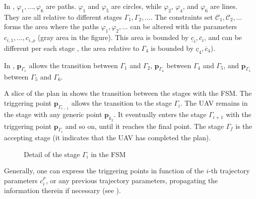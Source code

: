 In , $\varphi_1,\dots,\varphi_6$ are paths. $\varphi_1$ and $\varphi_5$ are circles, while $\varphi_2$, $\varphi_4$, and $\varphi_6$ are lines. They are all relative to different stages $\Gamma_1,\Gamma_2,\dots$. The constraints set $\mathcal{C}_1,\mathcal{C}_2,\dots$ forms the area where the paths $\varphi_1,\varphi_2,\dots$ can be altered with the parameters $c_{i,1},\dots,c_{i,\rho}$ (gray area in the figure). This area is bounded by $\underline{c}_i,\overline{c}_i$, and can be different per each stage , the area relative to $\Gamma_4$ is bounded by $\underline{c}_4,\overline{c}_4$).

In , $\mathbf{p}_{\Gamma_1}$ allows the transition between $\Gamma_1$ and $\Gamma_2$, $\mathbf{p}_{\Gamma_4}$ between $\Gamma_4$ and $\Gamma_5$, and $\mathbf{p}_{\Gamma_5}$ between $\Gamma_5$ and $\Gamma_6$.

A slice of the plan in  shows the transition between the stages with the FSM. The triggering point $\mathbf{p}_{\Gamma_{i-1}}$ allows the transition to the stage $\Gamma_i$. The UAV remains in the stage with any generic point $\mathbf{p}_{k_2}$. It eventually enters the stage $\Gamma_{i+1}$ with the triggering point $\mathbf{p}_{\Gamma_i}$ and so on, until it reaches the final point. The stage $\Gamma_f$ is the accepting stage (it indicates that the UAV has completed the plan).

\begin{figure}[h]
  \center
\caption[Detail of a stage in the FSM]{Detail of the stage $\Gamma_i$ in the FSM}
\label{fig:state-machine2}
\end{figure}
    
Generally, one can express the triggering points in function of the $i$-th trajectory parameters $c_{i}^{\rho}$, or any previous trajectory parameters, propagating the information therein if necessary (see ).
   

